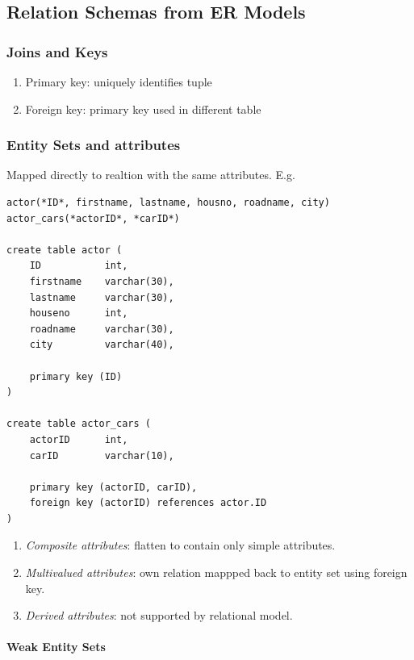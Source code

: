 \documentclass[twocolumn,english]{article}
\begin{document}
\subsection{Relation Schemas from ER Models}


\subsubsection{Joins and Keys}
\begin{enumerate}
\item Primary key: uniquely identifies tuple
\item Foreign key: primary key used in different table
\end{enumerate}

\subsubsection{Entity Sets and attributes}

Mapped directly to realtion with the same attributes. E.g.

\begin{lstlisting}
actor(*ID*, firstname, lastname, housno, roadname, city)
actor_cars(*actorID*, *carID*)

create table actor (
	ID           int,
	firstname    varchar(30),
	lastname     varchar(30),
	houseno      int,
	roadname     varchar(30),
	city         varchar(40),

	primary key (ID)
)

create table actor_cars (
	actorID      int,
	carID        varchar(10),
	
	primary key (actorID, carID),
	foreign key (actorID) references actor.ID
)
\end{lstlisting}

\begin{enumerate}
\item \emph{Composite attributes}: flatten to contain only simple attributes.
\item \emph{Multivalued attributes}: own relation mappped back to entity
set using foreign key.
\item \emph{Derived attributes}: not supported by relational model.
\end{enumerate}

\paragraph{Weak Entity Sets}
\end{document}
